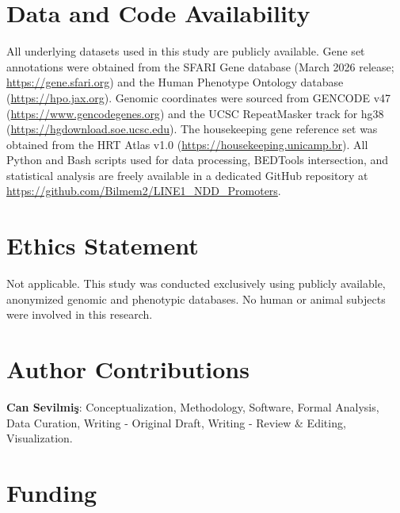 \documentclass[11pt, a4paper]{article}
\begin{document}
\section*{Data and Code Availability}

All underlying datasets used in this study are publicly available. Gene set annotations were obtained from the SFARI Gene database (March 2026 release; \url{https://gene.sfari.org}) and the Human Phenotype Ontology database (\url{https://hpo.jax.org}). Genomic coordinates were sourced from GENCODE v47 (\url{https://www.gencodegenes.org}) and the UCSC RepeatMasker track for hg38 (\url{https://hgdownload.soe.ucsc.edu}). The housekeeping gene reference set was obtained from the HRT Atlas v1.0 (\url{https://housekeeping.unicamp.br}). All Python and Bash scripts used for data processing, BEDTools intersection, and statistical analysis are freely available in a dedicated GitHub repository at \url{https://github.com/Bilmem2/LINE1_NDD_Promoters}.

\section*{Ethics Statement}

Not applicable. This study was conducted exclusively using publicly available, anonymized genomic and phenotypic databases. No human or animal subjects were involved in this research.

\section*{Author Contributions}

\textbf{Can Sevilmiş}: Conceptualization, Methodology, Software, Formal Analysis, Data Curation, Writing - Original Draft, Writing - Review \& Editing, Visualization.

\section*{Funding}
\end{document}
